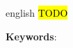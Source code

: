 \setlength{\absparsep}{18pt} %
\begin{resumo}[Abstract]
  \begin{otherlanguage*}{english}
    \hl{TODO} %

    \vspace{\onelineskip}

    \noindent 
    \textbf{Keywords}: 
  \end{otherlanguage*}
\end{resumo}
